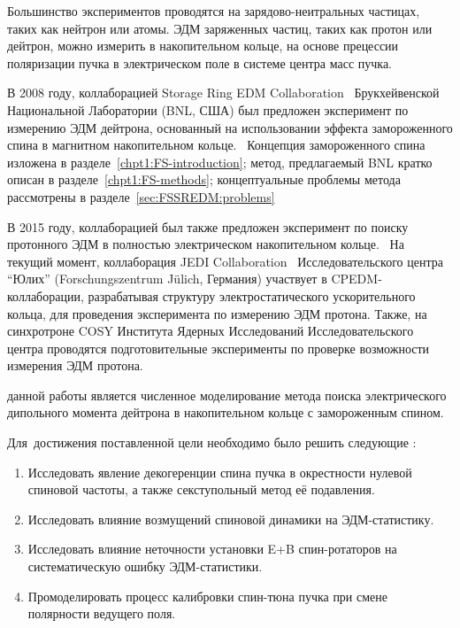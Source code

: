 Большинство экспериментов проводятся на зарядово-неитральных частицах, таких как нейтрон или атомы. ЭДМ заряженных частиц, таких как протон или дейтрон, можно измерить в накопительном кольце, на основе прецессии поляризации пучка в электрическом поле в системе центра масс пучка.

В 2008 году, коллаборацией Storage Ring EDM Collaboration~\cite{BNL:SREDM} Брукхейвенской Национальной Лаборатории (BNL, США) был предложен эксперимент по измерению ЭДМ дейтрона, основанный на использовании эффекта замороженного спина в магнитном накопительном кольце.~\cite{BNL:Deuteron2008} Концепция замороженного спина изложена в разделе~\ref{chpt1:FS-introduction}; метод, предлагаемый BNL кратко описан в разделе~\ref{chpt1:FS-methods}; концептуальные проблемы метода рассмотрены в разделе~\ref{sec:FSSREDM:problems}

В 2015 году, коллаборацией был также предложен эксперимент по поиску протонного ЭДМ в полностью электрическом накопительном кольце.~\cite{BNL:Proton} На текущий момент, коллаборация JEDI Collaboration~\cite{JEDI:Website} Исследовательского центра ``Юлих'' (Forschungszentrum J\"ulich, Германия) участвует в CPEDM-коллаборации, разрабатывая структуру электростатического ускорительного кольца, для проведения эксперимента по измерению ЭДМ протона. Также, на синхротроне COSY Института Ядерных Исследований Исследовательского центра проводятся подготовительные эксперименты по проверке возможности измерения ЭДМ протона.~\cite{Lehrach:Precursor2012, Lehrach:IPAC15, COSY:SpinTuneMapping, Wagner:BBA2018}


{\aim} данной работы является численное моделирование метода поиска электрического дипольного момента дейтрона в накопительном кольце с замороженным спином.

Для~достижения поставленной цели необходимо было решить следующие {\tasks}:
\begin{enumerate}
  \item Исследовать явление декогеренции спина пучка в окрестности нулевой спиновой частоты, а также секступольный метод её подавления. 
  \item Исследовать влияние возмущений спиновой динамики на ЭДМ-статистику.
  \item Исследовать влияние неточности установки E+B спин-ротаторов на систематическую ошибку ЭДМ-статистики.
  \item Промоделировать процесс калибровки спин-тюна пучка при смене полярности ведущего поля.
\end{enumerate}


